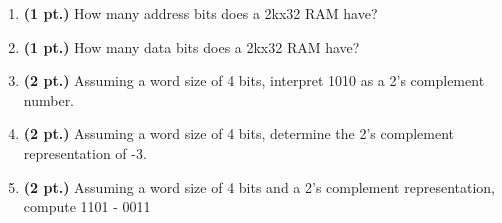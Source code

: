 \documentclass{article}
\begin{document}
\begin{enumerate}
\item {\bf (1 pt.)} How many address bits does a 2kx32 RAM have?

\item {\bf (1 pt.)} How many data bits does a 2kx32 RAM have?

\pagebreak

\item {\bf (2 pt.)} Assuming a word size of 4 bits, interpret 1010 as a 2's complement
number.

\item {\bf (2 pt.)} Assuming a word size of 4 bits, determine the 2's complement
representation of -3.

\item {\bf (2 pt.)} Assuming a word size of 4 bits and a 2's complement representation,
compute  1101 - 0011


\end{enumerate}
\end{document}
